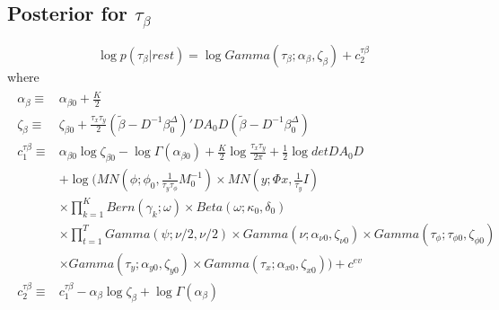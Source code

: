 \documentclass[11pt]{article}
\begin{document}
\subsection{Posterior for $\tau_\beta$}
\begin{equation}
	\log p\left(\tau_{\beta}|rest\right) = \log Gamma\left(\tau_{\beta};\alpha_{\beta},\zeta_{\beta}\right)+c_{2}^{\tau\beta}
\end{equation}
where
\begin{align*}
\begin{split}
	\alpha_{\beta}\equiv&\alpha_{\beta0}+\frac{K}{2}\\\zeta_{\beta}\equiv&\zeta_{\beta0}+\frac{\tau_{x}\tau_{y}}{2}\left(\tilde{\beta}-D^{-1}\beta_{0}^{\Delta}\right)'DA_{0}D\left(\tilde{\beta}-D^{-1}\beta_{0}^{\Delta}\right)\\c_{1}^{\tau\beta}\equiv&\alpha_{\beta0}\log\zeta_{\beta0}-\log\Gamma\left(\alpha_{\beta0}\right)+\frac{K}{2}\log\frac{\tau_{x}\tau_{y}}{2\pi}+\frac{1}{2}\log detDA_{0}D\\&+\log\Bigg(MN\left(\phi;\phi_{0},\frac{1}{\tau_{y}\tau_{\phi}}M_{0}^{-1}\right)\times MN\left(y;\Phi x,\frac{1}{\tau_{y}}I\right)\\&\times\prod_{k=1}^{K}Bern\left(\gamma_{k};\omega\right)\times Beta\left(\omega;\kappa_{0},\delta_{0}\right)\\&\times\prod_{t=1}^{T}Gamma\left(\psi;\nu/2,\nu/2\right)\times Gamma\left(\nu;\alpha_{\nu0},\zeta_{\nu0}\right)\times Gamma\left(\tau_{\phi};\tau_{\phi0},\zeta_{\phi0}\right)\\&\times Gamma\left(\tau_{y};\alpha_{y0},\zeta_{y0}\right)\times Gamma\left(\tau_{x};\alpha_{x0},\zeta_{x0}\right)\Bigg)+c^{ev}\\c_{2}^{\tau\beta}\equiv&c_{1}^{\tau\beta}-\alpha_{\beta}\log\zeta_{\beta}+\log\Gamma\left(\alpha_{\beta}\right)
\end{split}
\end{align*}
\end{document}

